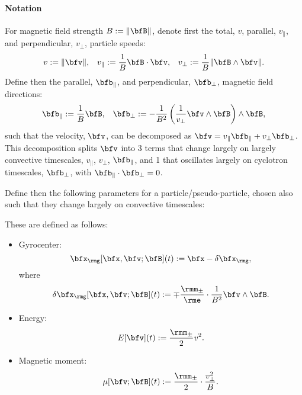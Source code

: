     \line

    \paragraph*{Notation}
    
    For magnetic field strength $B  :=  \|\bfB\|$, denote first the total, $v$, parallel, $v_{\parallel}$, and perpendicular, $v_{\perp}$, particle speeds:
    \begin{align}
                    v  :=  \|\bfv\|,   &&
        v_{\parallel}  :=  \frac{1}{B}\bfB\cdot\bfv,  &&
            v_{\perp}  :=  \frac{1}{B}\|\bfB\wedge\bfv\|.
    \end{align}
    Define then the parallel, $\bfb_{\parallel}$, and perpendicular, $\bfb_{\perp}$, magnetic field directions:
    \begin{align}
        \bfb_{\parallel}  :=  \frac{1}{B}\bfB,  &&
            \bfb_{\perp}  :=  - \frac{1}{B^{2}}\left(\frac{1}{v_{\perp}}\bfv\wedge\bfB\right)\wedge\bfB,
    \end{align}
    such that the velocity, $\bfv$, can be decomposed as $\bfv  =  v_{\parallel}\bfb_{\parallel} + v_{\perp}\bfb_{\perp}$. This decomposition splits $\bfv$ into 3 terms that change largely on largely convective timescales, $v_{\parallel}$, $v_{\perp}$, $\bfb_{\parallel}$, and 1 that oscillates largely on cyclotron timescales, $\bfb_{\perp}$, with $\bfb_{\parallel}\cdot\bfb_{\perp}  =  0$.

    Define then the following parameters for a particle/pseudo-particle, chosen also such that they change largely on convective timescales:

    \begin{definition}
        These are defined as follows:
        \begin{itemize}
            \item  Gyrocenter:
            \begin{equation}
                \bfx_{\rmg}[\bfx, \bfv; \bfB](t)  :=  \bfx - \delta\bfx_{\rmg},
            \end{equation}
            where
            \begin{equation}
                \delta\bfx_{\rmg}[\bfx, \bfv; \bfB](t)  :=  \mp \frac{\rmm_{\pm}}{\rme}\cdot\frac{1}{B^{2}}\bfv\wedge\bfB.
            \end{equation}
            \item  Energy:
            \begin{equation}
                E[\bfv](t)  :=  \frac{\rmm_{\pm}}{2}v^{2}.
            \end{equation}
            \item  Magnetic moment:
            \begin{equation}
                \mu[\bfv; \bfB](t)  :=  \frac{\rmm_{\pm}}{2}\cdot\frac{v_{\perp}^{2}}{B}.
            \end{equation}
        \end{itemize}
    \end{definition}
    
